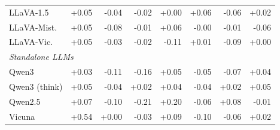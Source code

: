 \begin{table}[t]
\begin{tabular}{lrrrrrrr}
LLaVA-1.5 & \cellcolor{blue!10}+0.05 & \cellcolor{red!10}-0.04 & \cellcolor{gray!10}-0.02 & \cellcolor{gray!10}+0.00 & \cellcolor{blue!10}+0.06 & \cellcolor{red!10}-0.06 & \cellcolor{blue!10}+0.02 \\
LLaVA-Mist. & \cellcolor{blue!10}+0.05 & \cellcolor{red!10}-0.08 & \cellcolor{gray!10}-0.01 & \cellcolor{blue!10}+0.06 & \cellcolor{gray!10}-0.00 & \cellcolor{gray!10}-0.01 & \cellcolor{red!10}-0.06 \\
LLaVA-Vic. & \cellcolor{blue!10}+0.05 & \cellcolor{red!10}-0.03 & \cellcolor{red!10}-0.02 & \cellcolor{red!14}-0.11 & \cellcolor{gray!10}+0.01 & \cellcolor{red!11}-0.09 & \cellcolor{gray!10}+0.00 \\
\midrule
\multicolumn{8}{l}{\textit{Standalone LLMs}} \\
Qwen3 & \cellcolor{blue!10}+0.03 & \cellcolor{red!14}-0.11 & \cellcolor{red!20}-0.16 & \cellcolor{blue!10}+0.05 & \cellcolor{red!10}-0.05 & \cellcolor{red!10}-0.07 & \cellcolor{blue!10}+0.04 \\
Qwen3 (think) & \cellcolor{blue!10}+0.05 & \cellcolor{red!10}-0.04 & \cellcolor{gray!10}+0.02 & \cellcolor{blue!10}+0.04 & \cellcolor{red!10}-0.04 & \cellcolor{gray!10}+0.02 & \cellcolor{blue!10}+0.05 \\
Qwen2.5 & \cellcolor{blue!10}+0.07 & \cellcolor{red!13}-0.10 & \cellcolor{red!28}-0.21 & \cellcolor{blue!26}+0.20 & \cellcolor{red!10}-0.06 & \cellcolor{blue!11}+0.08 & \cellcolor{gray!10}-0.01 \\
Vicuna & \cellcolor{blue!40}+0.54 & \cellcolor{gray!10}+0.00 & \cellcolor{red!10}-0.03 & \cellcolor{blue!11}+0.09 & \cellcolor{red!13}-0.10 & \cellcolor{red!10}-0.06 & \cellcolor{blue!10}+0.02 \\
\bottomrule
\end{tabular}
\end{table}

